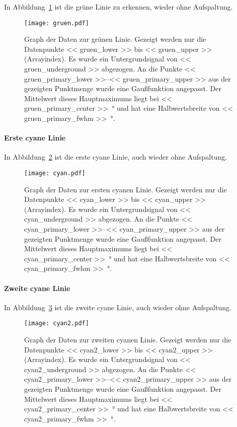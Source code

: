 In Abbildung~\ref{fig:gruen} ist die grüne Linie zu erkennen, wieder ohne
Aufspaltung.

\begin{figure}[htbp]
    \centering
    \texttt{[image: gruen.pdf]}
    \caption{%
        Graph der Daten zur grünen Linie. Gezeigt werden nur die Datenpunkte
        \num{<< gruen_lower >>} bis \num{<< gruen_upper >>} (Arrayindex). Es
        wurde ein Untergrundsignal von \num{<< gruen_underground >>} abgezogen.  An die
        Punkte \numrange{<< gruen_primary_lower >>}{<< gruen_primary_upper >>} aus
        der gezeigten Punktmenge wurde eine Gaußfunktion angepasst. Der
        Mittelwert dieses Hauptmaximums liegt bei \SI{<< gruen_primary_center
        >>}{\degree} und hat eine Halbwertsbreite von \SI{<< gruen_primary_fwhm
        >>}{\degree}.
    }
    \label{fig:gruen}
\end{figure}

\paragraph{Erste cyane Linie}

In Abbildung~\ref{fig:cyan} ist die erste cyane Linie, auch wieder ohne
Aufspaltung.

\begin{figure}[htbp]
    \centering
    \texttt{[image: cyan.pdf]}
    \caption{%
        Graph der Daten zur ersten cyanen Linie. Gezeigt werden nur die
        Datenpunkte \num{<< cyan_lower >>} bis \num{<< cyan_upper >>}
        (Arrayindex). Es wurde ein Untergrundsignal von \num{<< cyan_underground
        >>} abgezogen. An die Punkte \numrange{<< cyan_primary_lower >>}{<<
        cyan_primary_upper >>} aus der gezeigten Punktmenge wurde eine
        Gaußfunktion angepasst. Der Mittelwert dieses Hauptmaximums liegt bei
        \SI{<< cyan_primary_center >>}{\degree} und hat eine Halbwertsbreite von
        \SI{<< cyan_primary_fwhm >>}{\degree}.
    }
    \label{fig:cyan}
\end{figure}

\paragraph{Zweite cyane Linie}

In Abbildung~\ref{fig:cyan2} ist die zweite cyane Linie, auch wieder ohne
Aufspaltung.

\begin{figure}[htbp]
    \centering
    \texttt{[image: cyan2.pdf]}
    \caption{%
        Graph der Daten zur zweiten cyanen Linie. Gezeigt werden nur die
        Datenpunkte \num{<< cyan2_lower >>} bis \num{<< cyan2_upper >>}
        (Arrayindex). Es wurde ein Untergrundsignal von \num{<< cyan2_underground
        >>} abgezogen. An die Punkte \numrange{<< cyan2_primary_lower >>}{<<
        cyan2_primary_upper >>} aus der gezeigten Punktmenge wurde eine
        Gaußfunktion angepasst. Der Mittelwert dieses Hauptmaximums liegt bei
        \SI{<< cyan2_primary_center >>}{\degree} und hat eine Halbwertsbreite von
        \SI{<< cyan2_primary_fwhm >>}{\degree}.
    }
    \label{fig:cyan2}
\end{figure}

